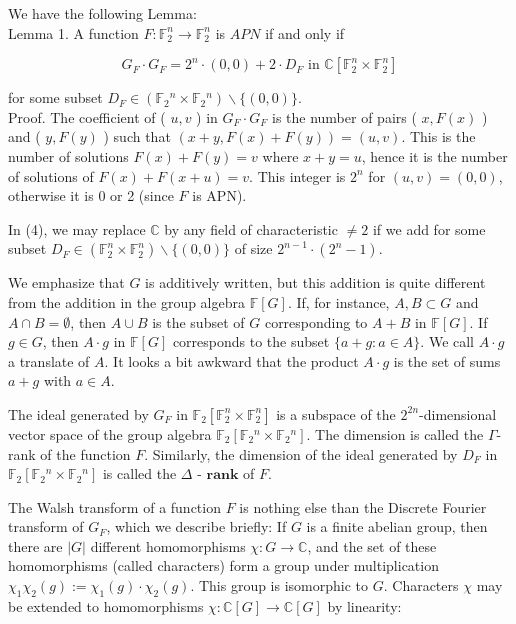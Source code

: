 \documentclass[10pt]{article}
\begin{document}
We have the following Lemma:\\
Lemma 1. A function $F: \mathbb{F}_{2}^{n} \rightarrow \mathbb{F}_{2}^{n}$ is $A P N$ if and only if


\begin{equation*}
G_{F} \cdot G_{F}=2^{n} \cdot(0,0)+2 \cdot D_{F} \text { in } \mathbb{C}\left[\mathbb{F}_{2}^{n} \times \mathbb{F}_{2}^{n}\right] \tag{4}
\end{equation*}


for some subset $D_{F} \in\left(\mathbb{F}_{2}{ }^{n} \times \mathbb{F}_{2}{ }^{n}\right) \backslash\{(0,0)\}$.\\
Proof. The coefficient of ( $u, v$ ) in $G_{F} \cdot G_{F}$ is the number of pairs ( $x, F(x)$ ) and ( $y, F(y)$ ) such that $(x+y, F(x)+F(y))=(u, v)$. This is the number of solutions $F(x)+F(y)=v$ where $x+y=u$, hence it is the number of solutions of $F(x)+F(x+u)=v$. This integer is $2^{n}$ for $(u, v)=(0,0)$, otherwise it is 0 or 2 (since $F$ is APN).

In (4), we may replace $\mathbb{C}$ by any field of characteristic $\neq 2$ if we add for some subset $D_{F} \in \left(\mathbb{F}_{2}^{n} \times \mathbb{F}_{2}^{n}\right) \backslash\{(0,0)\}$ of size $2^{n-1} \cdot\left(2^{n}-1\right)$.

We emphasize that $G$ is additively written, but this addition is quite different from the addition in the group algebra $\mathbb{F}[G]$. If, for instance, $A, B \subset G$ and $A \cap B=\emptyset$, then $A \cup B$ is the subset of $G$ corresponding to $A+B$ in $\mathbb{F}[G]$. If $g \in G$, then $A \cdot g$ in $\mathbb{F}[G]$ corresponds to the subset $\{a+g: a \in A\}$. We call $A \cdot g$ a translate of $A$. It looks a bit awkward that the product $A \cdot g$ is the set of sums $a+g$ with $a \in A$.

The ideal generated by $G_{F}$ in $\mathbb{F}_{2}\left[\mathbb{F}_{2}^{n} \times \mathbb{F}_{2}^{n}\right]$ is a subspace of the $2^{2 n}$-dimensional vector space of the group algebra $\mathbb{F}_{2}\left[\mathbb{F}_{2}{ }^{n} \times \mathbb{F}_{2}{ }^{n}\right]$. The dimension is called the $\Gamma$-rank of the function $F$. Similarly, the dimension of the ideal generated by $D_{F}$ in $\mathbb{F}_{2}\left[\mathbb{F}_{2}{ }^{n} \times \mathbb{F}_{2}{ }^{n}\right]$ is called the $\Delta$ - $\mathbf{r a n k}$ of $F$.

The Walsh transform of a function $F$ is nothing else than the Discrete Fourier transform of $G_{F}$, which we describe briefly: If $G$ is a finite abelian group, then there are $|G|$ different homomorphisms $\chi: G \rightarrow \mathbb{C}$, and the set of these homomorphisms (called characters) form a group under multiplication $\chi_{1} \chi_{2}(g):=\chi_{1}(g) \cdot \chi_{2}(g)$. This group is isomorphic to $G$. Characters $\chi$ may be extended to homomorphisms $\chi: \mathbb{C}[G] \rightarrow \mathbb{C}[G]$ by linearity:
\end{document}
